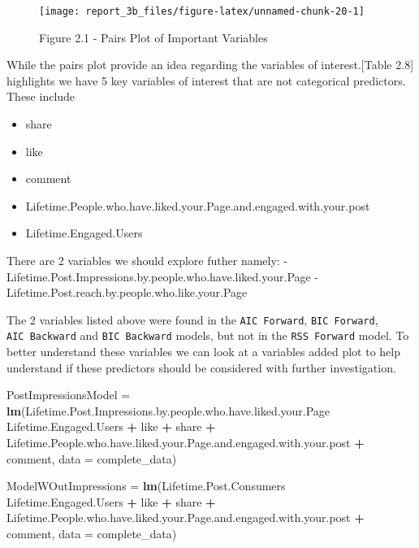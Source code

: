 \documentclass[
]{article}
\newenvironment{Shaded}{\begin{snugshade}}{\end{snugshade}}
\newcommand{\DataTypeTok}[1]{\textcolor[rgb]{0.13,0.29,0.53}{#1}}
\newcommand{\KeywordTok}[1]{\textcolor[rgb]{0.13,0.29,0.53}{\textbf{#1}}}
\newcommand{\NormalTok}[1]{#1}
\newcommand{\OperatorTok}[1]{\textcolor[rgb]{0.81,0.36,0.00}{\textbf{#1}}}
\newcommand{\StringTok}[1]{\textcolor[rgb]{0.31,0.60,0.02}{#1}}
\providecommand{\tightlist}{%
  \setlength{\itemsep}{0pt}\setlength{\parskip}{0pt}}
\begin{document}
\begin{figure}

{\centering \texttt{[image: report\_3b\_files/figure-latex/unnamed-chunk-20-1]} 

}

\caption{Figure 2.1 - Pairs Plot of Important Variables}\label{fig:unnamed-chunk-20}
\end{figure}

While the pairs plot provide an idea regarding the variables of
interest.{[}Table 2.8{]} highlights we have 5 key variables of interest
that are not categorical predictors. These include

\begin{itemize}
\tightlist
\item
  share
\item
  like
\item
  comment
\item
  Lifetime.People.who.have.liked.your.Page.and.engaged.with.your.post
\item
  Lifetime.Engaged.Users
\end{itemize}

There are 2 variables we should explore futher namely: -
Lifetime.Post.Impressions.by.people.who.have.liked.your.Page -
Lifetime.Post.reach.by.people.who.like.your.Page

The 2 variables listed above were found in the \texttt{AIC\ Forward},
\texttt{BIC\ Forward}, \texttt{AIC\ Backward} and \texttt{BIC\ Backward}
models, but not in the \texttt{RSS\ Forward} model. To better understand
these variables we can look at a variables added plot to help understand
if these predictors should be considered with further investigation.

\begin{Shaded}
\begin{Highlighting}[]
\NormalTok{PostImpressionsModel =}\StringTok{ }\KeywordTok{lm}\NormalTok{(Lifetime.Post.Impressions.by.people.who.have.liked.your.Page }\OperatorTok{~}\StringTok{ }
\StringTok{                        }\NormalTok{Lifetime.Engaged.Users }\OperatorTok{+}\StringTok{ }\NormalTok{like }\OperatorTok{+}\StringTok{ }
\StringTok{                        }\NormalTok{share }\OperatorTok{+}\StringTok{ }\NormalTok{Lifetime.People.who.have.liked.your.Page.and.engaged.with.your.post }\OperatorTok{+}\StringTok{ }
\StringTok{                        }\NormalTok{comment, }\DataTypeTok{data  =}\NormalTok{ complete_data)}

\NormalTok{ModelWOutImpressions =}\StringTok{ }\KeywordTok{lm}\NormalTok{(Lifetime.Post.Consumers  }\OperatorTok{~}\StringTok{ }\NormalTok{Lifetime.Engaged.Users }\OperatorTok{+}\StringTok{ }\NormalTok{like }\OperatorTok{+}\StringTok{ }
\StringTok{                            }\NormalTok{share }\OperatorTok{+}\StringTok{ }\NormalTok{Lifetime.People.who.have.liked.your.Page.and.engaged.with.your.post }
                          \OperatorTok{+}\StringTok{ }\NormalTok{comment, }\DataTypeTok{data  =}\NormalTok{ complete_data)}
\end{Highlighting}
\end{Shaded}
\end{document}

